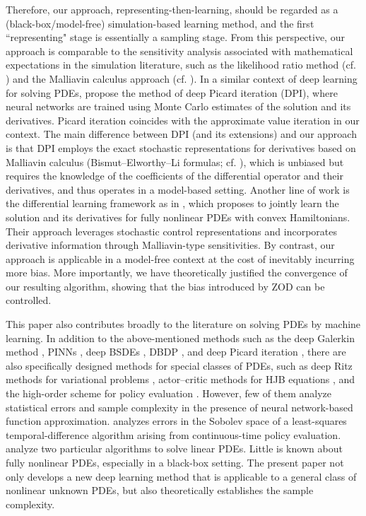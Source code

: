 \documentclass[twoside,11pt]{article}
\newcommand{\1}{\mathbf{1}}
\numberwithin{equation}{section}
\begin{document}
Therefore, our approach, representing-then-learning, should be regarded as a (black-box/model-free) simulation-based learning method, and the first ``representing" stage is essentially a sampling stage. From this perspective, our approach is comparable to the sensitivity analysis associated with mathematical expectations in the simulation literature, such as the likelihood ratio method (cf. \citealt{glasserman2004monte}) and the Malliavin calculus approach (cf. \citealt{ma2002representation}). In a similar context of deep learning for solving PDEs, \citet{han26} propose the method of deep Picard iteration (DPI), where neural networks are trained using Monte Carlo estimates of the solution and its derivatives. Picard iteration coincides with the approximate value iteration in our context. The main difference between DPI (and its extensions) and our approach is that DPI employs the exact stochastic representations for derivatives based on Malliavin calculus (Bismut–Elworthy–Li formulas; cf. \citealt{banos2018bismut}), which is unbiased but requires the knowledge of the coefficients of the differential operator and their derivatives, and thus operates in a model-based setting.
Another line of work is the differential learning framework as in \citet{lef23}, which proposes to jointly learn the solution and its derivatives for fully nonlinear PDEs with convex Hamiltonians. Their approach leverages stochastic control representations and incorporates derivative information through Malliavin-type sensitivities. By contrast, our approach is applicable in a model-free context at the cost of inevitably incurring more bias. More importantly, we have theoretically justified the convergence of our resulting algorithm, showing that the bias introduced by ZOD can be controlled. %

This paper also contributes broadly to the literature on solving PDEs by machine learning. In addition to the above-mentioned methods such as the deep Galerkin method \citep{siri18}, PINNs \citep{raissi19}, deep BSDEs \citep{han17}, DBDP \citep{hure20}, and deep Picard iteration \citep{han26}, there are also specifically designed methods for special classes of PDEs, such as deep Ritz methods for variational problems \citep{yu2018deep,lu2021priori}, actor--critic methods for HJB equations
\citep{zhou2021actor,jia2022pg,zhu2025optimal}, and the high-order scheme for policy evaluation \citep{mou2024bellman}. However, few of them analyze statistical errors and sample complexity in the presence of neural network-based function approximation. \citet{mou2025statistical} analyzes errors in the Sobolev space of a least-squares temporal-difference algorithm arising from continuous-time policy evaluation. \citet{lumachine} analyze two particular algorithms to solve linear PDEs. Little is known about fully nonlinear PDEs, especially in a black-box setting. The present paper not only develops a new deep learning method that is applicable to a general class of nonlinear unknown PDEs, but also theoretically establishes the sample complexity.
\end{document}
